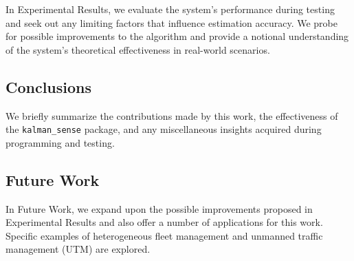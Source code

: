 In Experimental Results, we evaluate the system's performance during testing and seek out any limiting factors that influence estimation accuracy. We probe for possible improvements to the algorithm and provide a notional understanding of the system's theoretical effectiveness in real-world scenarios.

\subsection*{Conclusions}

We briefly summarize the contributions made by this work, the effectiveness of the \texttt{kalman\_sense} package, and any miscellaneous insights acquired during programming and testing. 

\subsection*{Future Work}

In Future Work, we expand upon the possible improvements proposed in Experimental Results and also offer a number of applications for this work. Specific examples of heterogeneous fleet management and unmanned traffic management (UTM) are explored.